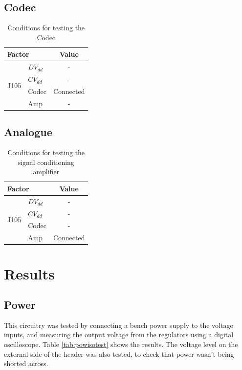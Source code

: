 \subsection{Codec}
\begin{table}[H]
	\centering
	\begin{tabular}[c]{| l | l | c |}
		\hline
		\multicolumn{2}{|l|}{Factor}		& Value	\\
		\hline
		\multirow{4}{*}{J105}	& $DV_{dd}$	& -		\\
					& $CV_{dd}$	& -		\\
					& Codec		& Connected	\\
					& Amp		& -		\\
		\hline
	\end{tabular}
	\caption{Conditions for testing the Codec}
	\label{tab:codectestconditions}
\end{table}


\subsection{Analogue}
\begin{table}[H]
	\centering
	\begin{tabular}[c]{| l | l | c |}
		\hline
		\multicolumn{2}{|l|}{Factor}		& Value	\\
		\hline
		\multirow{4}{*}{J105}	& $DV_{dd}$	& -		\\
					& $CV_{dd}$	& -		\\
					& Codec		& -		\\
					& Amp		& Connected	\\
		\hline
	\end{tabular}
	\caption{Conditions for testing the signal conditioning amplifier}
	\label{tab:analoguetestconditions}
\end{table}

\section{Results}
\label{ssec:testHWresults}
\subsection{Power}
This circuitry was tested by connecting a bench power supply to the voltage inputs, and measuring the output voltage from the regulators using a digital oscilloscope.
Table \ref{tab:powisotest} shows the results.
The voltage level on the external side of the header was also tested, to check that power wasn't being shorted across.

